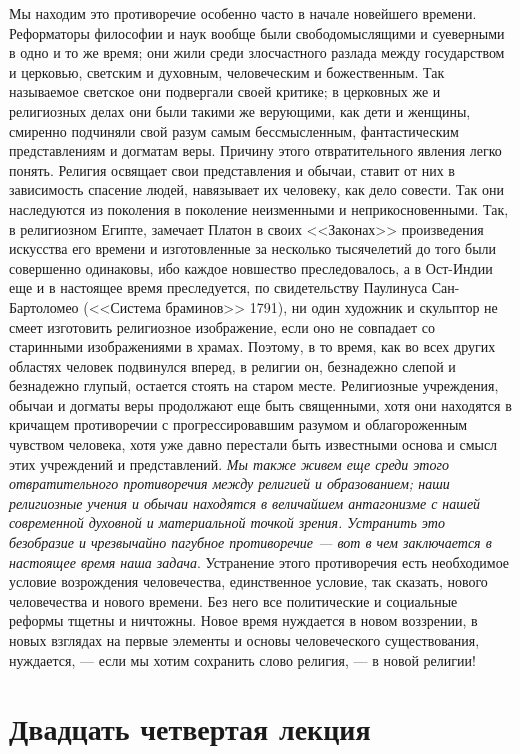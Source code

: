\documentclass[12pt]{article}
\begin{document}
Мы находим это противоречие особенно часто в начале новейшего времени. Реформаторы философии и наук вообще были свободомыслящими и суеверными в одно и то же время; они жили среди злосчастного разлада между государством и церковью, светским и духовным, человеческим и божественным. Так называемое светское они подвергали своей критике; в церковных же и религиозных делах они были такими же верующими, как дети и женщины, смиренно подчиняли свой разум самым бессмысленным, фантастическим представлениям и догматам веры. Причину этого отвратительного явления легко понять. Религия освящает свои представления и обычаи, ставит от них в зависимость спасение людей, навязывает их человеку, как дело совести. Так они наследуются из поколения в поколение неизменными и неприкосновенными. Так, в религиозном Египте, замечает Платон в своих <<Законах>>  произведения искусства его времени и изготовленные за несколько тысячелетий до того были совершенно одинаковы, ибо каждое новшество преследовалось, а в Ост-Индии еще и в настоящее время преследуется, по свидетельству Паулинуса Сан-Бартоломео (<<Система браминов>>  1791), ни один художник и скульптор не смеет изготовить религиозное изображение, если оно не совпадает со старинными изображениями в храмах. Поэтому, в то время, как во всех других областях человек подвинулся вперед, в религии он, безнадежно слепой и безнадежно глупый, остается стоять на старом месте. Религиозные учреждения, обычаи и догматы веры продолжают еще быть священными, хотя они находятся в кричащем противоречии с прогрессировавшим разумом и облагороженным чувством человека, хотя уже давно перестали быть известными основа и смысл этих учреждений и представлений. \emph{Мы также живем еще среди этого отвратительного противоречия между религией и образованием; наши религиозные учения и обычаи находятся в величайшем антагонизме с нашей современной духовной и материальной точкой зрения. Устранить это безобразие и чрезвычайно пагубное противоречие --- вот в чем заключается в настоящее время наша задача}. Устранение этого противоречия есть необходимое условие возрождения человечества, единственное условие, так сказать, нового человечества и нового времени. Без него все политические и социальные реформы тщетны и ничтожны. Новое время нуждается в новом воззрении, в новых взглядах на первые элементы и основы человеческого существования, нуждается, --- если мы хотим сохранить слово религия, --- в новой религии! 

{}
\section*{Двадцать четвертая лекция}
\end{document}
